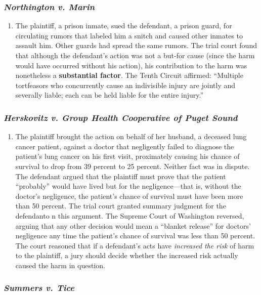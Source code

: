 \subsubsection{\emph{Northington v. Marin}}

\begin{enumerate}
    \item The plaintiff, a prison inmate, sued the defendant, a prison guard, for circulating rumors that labeled him a snitch and caused other inmates to assault him. Other guards had spread the same rumors. The trial court found that although the defendant's action was not a but-for cause (since the harm would have occurred without his action), his contribution to the harm was nonetheless a \textbf{substantial factor}. The Tenth Circuit affirmed: ``Multiple tortfeasors who concurrently cause an indivisible injury are jointly and severally liable; each can be held liable for the entire injury.''
\end{enumerate}

\subsubsection{\emph{Herskovitz v. Group Health Cooperative of Puget Sound}}

\begin{enumerate}
    \item The plaintiff brought the action on behalf of her husband, a deceased lung cancer patient, against a doctor that negligently failed to diagnose the patient's lung cancer on his first visit, proximately causing his chance of survival to drop from 39 percent to 25 percent. Neither fact was in dispute. The defendant argued that the plaintiff must prove that the patient ``probably'' would have lived but for the negligence---that is, without the doctor's negligence, the patient's chance of survival must have been more than 50 percent. The trial court granted summary judgment for the defendanto n this argument. The Supreme Court of Washington reversed, arguing that any other decision would mean a ``blanket release'' for doctors' negligence any time the patient's chance of survival was less than 50 percent. The court reasoned that if a defendant's acts have \emph{increased the risk} of harm to the plaintiff, a jury should decide whether the increased risk actually caused the harm in question.
\end{enumerate}

\subsubsection{\emph{Summers v. Tice}}

